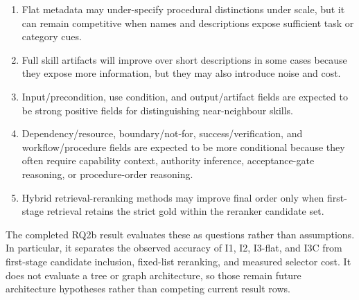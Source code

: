 \begin{enumerate}
  \item Flat metadata may under-specify procedural distinctions under scale, but it can remain competitive when names and descriptions expose sufficient task or category cues.
  \item Full skill artifacts will improve over short descriptions in some cases because they expose more information, but they may also introduce noise and cost.
  \item Input/precondition, use condition, and output/artifact fields are expected to be strong positive fields for distinguishing near-neighbour skills.
  \item Dependency/resource, boundary/not-for, success/verification, and workflow/procedure fields are expected to be more conditional because they often require capability context, authority inference, acceptance-gate reasoning, or procedure-order reasoning.
  \item Hybrid retrieval-reranking methods may improve final order only when first-stage retrieval retains the strict gold within the reranker candidate set.
\end{enumerate}

The completed RQ2b result evaluates these as questions rather than assumptions. In particular, it separates the observed accuracy of I1, I2, I3-flat, and I3C from first-stage candidate inclusion, fixed-list reranking, and measured selector cost. It does not evaluate a tree or graph architecture, so those remain future architecture hypotheses rather than competing current result rows.
